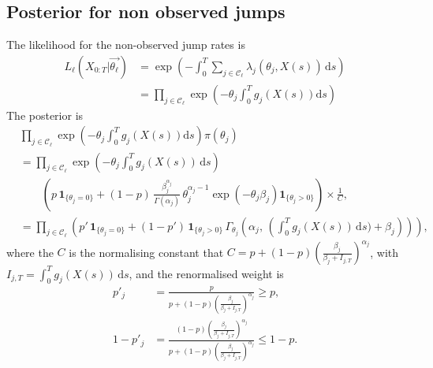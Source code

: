 \documentclass[pdflatex,sn-mathphys-num]{sn-jnl}%
\def\dd{\text{d}}
\theoremstyle{thmstyleone}%
\theoremstyle{thmstyletwo}%
\theoremstyle{thmstylethree}%
\begin{document}
\begin{appendices}
\section{Posterior for non observed jumps}
The likelihood for the non-observed jump rates is 
\begin{equation}
\begin{aligned}
L_\ell\left(X_{0:T}\big|\overrightarrow{\theta_\ell}\right)&  = 
    \exp\!\left(
 - \int_0^T \sum_{j\in\mathcal C_\ell} \lambda_j(\theta_j, X(s)) \, \mathrm{d}s
\right) 
    \\
        &= \prod_{j\in\mathcal C_\ell} \exp\left(
 - \theta_j \int_0^T   g_j\left( X(s) \right)  \dd s \right)
\end{aligned}
\end{equation}
The posterior is
\begin{equation}
    \begin{aligned}
       & \prod_{j\in\mathcal C_\ell}\exp\left(
        - \theta_j  \int_0^T g_j\left( X(s) \right) \dd s\right) \pi( \theta_j ) 
        \\ 
        &=  \prod_{j \in \mathcal C_\ell} 
      \exp\!\left(
        - \theta_j \int_0^T g_j\!\left( X(s) \right) \, \mathrm{d}s
      \right) \\
      & \quad\quad 
      \left(
        p\,\mathbf{1}_{\{\theta_{j}=0\}} 
        + (1-p)\,
          \frac{\beta_j^{\alpha_j}}{\Gamma(\alpha_j)}\,
          \theta_j^{\alpha_j-1} 
          \exp\!\left( -\theta_j \beta_j \right)
          \mathbf{1}_{\{\theta_{j}>0\}}
      \right)\times \frac{1}{C},
        \\
        &= \prod_{j\in \mathcal C_\ell}
\left(
  p'\,\mathbf{1}_{\{\theta_j=0\}}
  + (1-p')\,\mathbf{1}_{\{\theta_j>0\}}\,
       \Gamma_{\theta_j} \left( {\alpha_j}, \, 
        \left( \int_0^T g_j(X(s))\,\mathrm{d}s\big)+  \beta_j \right) 
\right) \right), 
    \end{aligned}
\end{equation}
where the $C$ is the normalising constant that 
$C=p + (1-p)\left(\frac{\beta_j}{\beta_j+I_{j,T}}\right)^{\alpha_j}$, with $I_{j,T}= \int_0^T g_j(X(s))\,\mathrm{d}s$, and the renormalised weight is 
\begin{align}
 p'_j&= \frac{p}{ p+ (1-p)\left(\frac{\beta_j}{\beta_j+I_{j,T}}\right)^{\alpha_j}} \geq p, \\
1-p'_j &= \frac{(1-p)\left(\frac{\beta_j}{\beta_j+I_{j,T}}\right)^{\alpha_j}}{p+ (1-p)\left(\frac{\beta_j}{\beta_j+I_{j,T}}\right)^{\alpha_j}} \leq 1- p .
\end{align}


\end{appendices}
\end{document}
